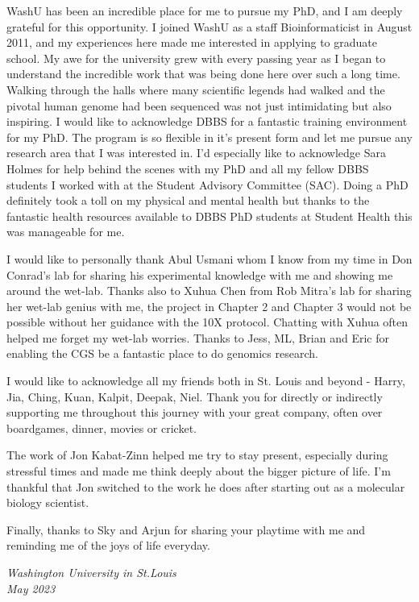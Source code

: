 WashU has been an incredible place for me to pursue my PhD, and I am deeply grateful for this opportunity. I joined WashU as a staff Bioinformaticist in August 2011, and my experiences here made me interested in applying to graduate school. My awe for the university grew with every passing year as I began to understand the incredible work that was being done here over such a long time. Walking through the halls where many scientific legends had walked and the pivotal human genome had been sequenced was not just intimidating but also inspiring. I would like to acknowledge DBBS for a fantastic training environment for my PhD. The program is so flexible in it's present form and let me pursue any research area that I was interested in. I'd especially like to acknowledge Sara Holmes for help behind the scenes with my PhD and all my fellow DBBS students I worked with at the Student Advisory Committee (SAC). Doing a PhD definitely took a toll on my physical and mental health but thanks to the fantastic health resources available to DBBS PhD students at Student Health this was manageable for me. 

I would like to personally thank Abul Usmani whom I know from my time in Don Conrad's lab for sharing his experimental knowledge with me and showing me around the wet-lab. Thanks also to Xuhua Chen from Rob Mitra's lab for sharing her wet-lab genius with me, the project in Chapter 2 and Chapter 3 would not be possible without her guidance with the 10X protocol. Chatting with Xuhua often helped me forget my wet-lab worries. Thanks to Jess, ML, Brian and Eric for enabling the CGS be a fantastic place to do genomics research.

I would like to acknowledge all my friends both in St. Louis and beyond - Harry, Jia, Ching, Kuan, Kalpit, Deepak, Niel. Thank you for directly or indirectly supporting me throughout this journey with your great company, often over boardgames, dinner, movies or cricket.

The work of Jon Kabat-Zinn \cite{ludwig2008j} helped me try to stay present, especially during stressful times and made me think deeply about the bigger picture of life. I'm  thankful that Jon switched to the work he does after starting out as a molecular biology scientist.

Finally, thanks to Sky and Arjun for sharing your playtime with me and reminding me of the joys of life everyday.

\null\hfill \thesisauthor

\noindent
\textit{Washington University in St.\@ Louis}\\
\textit{May 2023}
